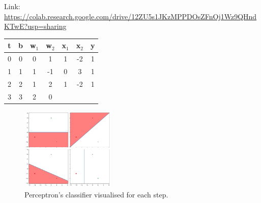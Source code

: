 \begin{solution}
  Link: \url{https://colab.research.google.com/drive/12ZU5s1JKzMPPDOsZFnOj1Wz9QHndKTwE?usp=sharing}
  \begin{center}
		\begin{tabular}{ |c|c|c|c|c|c|c| } 
			\hline
			t & b & w$_1$ & w$_2$  & x$_1$ &  x$_2$ & y \\ 
			\hline
			0 & 0 & 0 & 1 & 1 & -2 & 1\\ 
			1 & 1 & 1 & -1 & 0 & 3 & 1\\
			2 & 2 & 1 & 2 & 1 & -2 & 1\\
			3 & 3 & 2 & 0 & & &  \\
			\hline
		\end{tabular}
	\end{center}

  \begin{figure}[H]
    \centering
    \includegraphics[width=0.4\textwidth]{separable_PLA.pdf}
    \caption{Perceptron's classifier visualised for each step.}
  \end{figure}
\end{solution}

